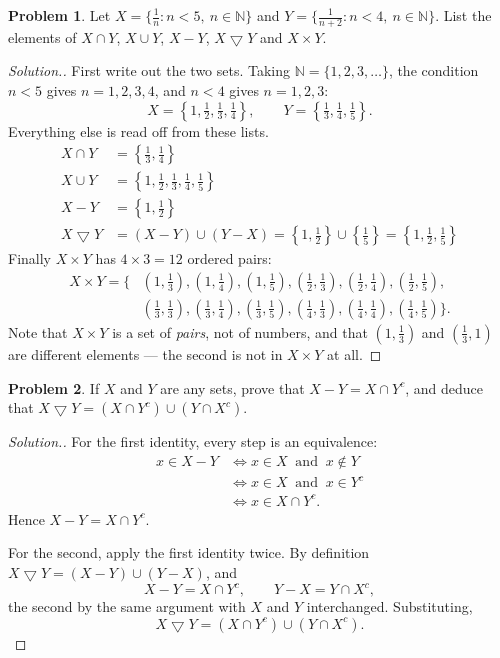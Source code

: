 \documentclass[11pt,a4paper]{article}
\theoremstyle{definition}
\newtheorem{problemx}{Problem}[section]
\newenvironment{problem}{\begin{problemx}}{\end{problemx}}
\newenvironment{solution}
  {\renewcommand{\qedsymbol}{}\begin{proof}[\textit{Solution}.]}
  {\end{proof}}
\begin{document}
\begin{problem}
Let $X=\Big\{\frac{1}{n}:n<5,\ n\in \mathbb{N}\Big\}$ and
$Y=\Big\{\frac{1}{n+2}:n<4,\ n\in \mathbb{N}\Big\}$. List the elements of
$X\cap Y$, $X\cup Y$, $X-Y$, $X\bigtriangledown Y$ and $X\times Y$.
\end{problem}
\begin{solution}
First write out the two sets. Taking $\mathbb{N}=\{1,2,3,\dots\}$, the
condition $n<5$ gives $n=1,2,3,4$, and $n<4$ gives $n=1,2,3$:
$$X=\left\{1,\tfrac{1}{2},\tfrac{1}{3},\tfrac{1}{4}\right\},\qquad
Y=\left\{\tfrac{1}{3},\tfrac{1}{4},\tfrac{1}{5}\right\}.$$
Everything else is read off from these lists.
\begin{align*}
X\cap Y &=\left\{\tfrac{1}{3},\tfrac{1}{4}\right\}\\
X\cup Y &=\left\{1,\tfrac{1}{2},\tfrac{1}{3},\tfrac{1}{4},\tfrac{1}{5}\right\}\\
X-Y &=\left\{1,\tfrac{1}{2}\right\}\\
X\bigtriangledown Y &=(X-Y)\cup(Y-X)
 =\left\{1,\tfrac{1}{2}\right\}\cup\left\{\tfrac{1}{5}\right\}
 =\left\{1,\tfrac{1}{2},\tfrac{1}{5}\right\}
\end{align*}
Finally $X\times Y$ has $4\times 3=12$ ordered pairs:
\begin{align*}
X\times Y=\Big\{&(1,\tfrac13),(1,\tfrac14),(1,\tfrac15),
(\tfrac12,\tfrac13),(\tfrac12,\tfrac14),(\tfrac12,\tfrac15),\\
&(\tfrac13,\tfrac13),(\tfrac13,\tfrac14),(\tfrac13,\tfrac15),
(\tfrac14,\tfrac13),(\tfrac14,\tfrac14),(\tfrac14,\tfrac15)\Big\}.
\end{align*}
Note that $X\times Y$ is a set of \emph{pairs}, not of numbers, and that
$(1,\tfrac13)$ and $(\tfrac13,1)$ are different elements --- the second is not
in $X\times Y$ at all.
\end{solution}

\begin{problem}
If $X$ and $Y$ are any sets, prove that $X-Y=X\cap Y^c$, and deduce that
$X\bigtriangledown Y=(X\cap Y^c)\cup (Y\cap X^c)$.
\end{problem}
\begin{solution}
For the first identity, every step is an equivalence:
\begin{align*}
x\in X-Y &\iff x\in X \ \text{ and }\ x\notin Y\\
         &\iff x\in X \ \text{ and }\ x\in Y^c\\
         &\iff x\in X\cap Y^c.
\end{align*}
Hence $X-Y=X\cap Y^c$.

For the second, apply the first identity twice. By definition
$X\bigtriangledown Y=(X-Y)\cup(Y-X)$, and
$$X-Y=X\cap Y^c,\qquad Y-X=Y\cap X^c,$$
the second by the same argument with $X$ and $Y$ interchanged. Substituting,
$$X\bigtriangledown Y=(X\cap Y^c)\cup (Y\cap X^c).$$
\end{solution}
\end{document}

